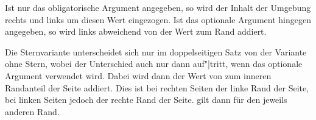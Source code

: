 Ist nur das obligatorische Argument  angegeben, so wird der
Inhalt der Umgebung rechts und links um diesen Wert eingezogen. Ist das
optionale Argument  hingegen angegeben, so wird links
abweichend von  der Wert  zum Rand addiert.

Die Sternvariante 
unterscheidet sich nur im doppelseitigen Satz von der Variante ohne Stern,
wobei der Unterschied auch nur dann auf"|tritt, wenn das optionale Argument
 verwendet wird. Dabei wird dann der Wert von
 zum inneren Randanteil der Seite addiert. Dies ist bei
rechten Seiten der linke Rand der Seite, bei linken Seiten jedoch der rechte
Rand der Seite.  gilt dann für den jeweils anderen Rand.

